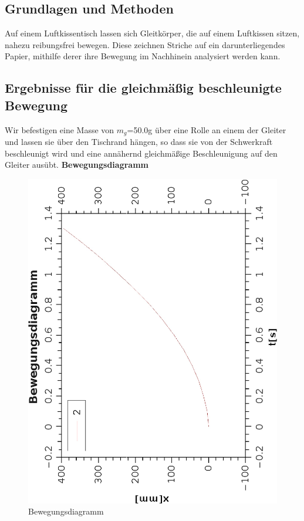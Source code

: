 \documentclass{article}
\begin{document}
\subsection{Grundlagen und Methoden}

Auf einem Luftkissentisch lassen sich Gleitkörper, die auf einem Luftkissen sitzen, nahezu reibungsfrei bewegen. Diese zeichnen Striche auf ein darunterliegendes Papier, mithilfe derer ihre Bewegung im Nachhinein analysiert werden kann. 



\subsection{Ergebnisse für die gleichmäßig beschleunigte Bewegung}
 Wir befestigen eine Masse von $m_g$=50.0g über eine Rolle an einem der Gleiter und lassen sie über den Tischrand hängen, so dass sie von der Schwerkraft beschleunigt wird und eine annähernd gleichmäßige Beschleunigung auf den Gleiter ausübt.
\textbf{Bewegungsdiagramm}
\begin{figure}[H]
\caption{Bewegungsdiagramm}
\begin{center}
\includegraphics[scale=0.7,angle=-90]{glmbeschlBewegDiag.eps}
\end{center}
\end{figure}
\end{document}

